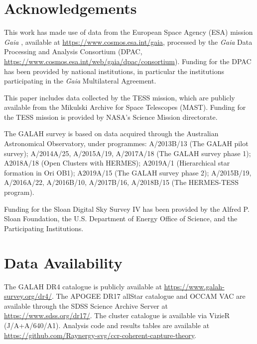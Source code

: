 \documentclass[fleqn,usenatbib]{mnras}
\begin{document}
\section*{Acknowledgements}

This work has made use of data from the European Space Agency (ESA) mission {\it Gaia} \citep{GaiaCollaboration2023}, available at \url{https://www.cosmos.esa.int/gaia}, processed by the {\it Gaia} Data Processing and Analysis Consortium (DPAC, \url{https://www.cosmos.esa.int/web/gaia/dpac/consortium}).
Funding for the DPAC has been provided by national institutions, in particular the institutions participating in the {\it Gaia} Multilateral Agreement.

This paper includes data collected by the TESS mission, which are publicly available from the Mikulski Archive for Space Telescopes (MAST).
Funding for the TESS mission is provided by NASA's Science Mission directorate.

The GALAH survey is based on data acquired through the Australian Astronomical Observatory, under programmes: A/2013B/13 (The GALAH pilot survey); A/2014A/25, A/2015A/19, A/2017A/18 (The GALAH survey phase 1); A2018A/18 (Open Clusters with HERMES); A2019A/1 (Hierarchical star formation in Ori OB1); A2019A/15 (The GALAH survey phase 2); A/2015B/19, A/2016A/22, A/2016B/10, A/2017B/16, A/2018B/15 (The HERMES-TESS program).

Funding for the Sloan Digital Sky Survey IV has been provided by the Alfred P. Sloan Foundation, the U.S. Department of Energy Office of Science, and the Participating Institutions.

\section*{Data Availability}

The GALAH DR4 catalogue is publicly available at \url{https://www.galah-survey.org/dr4/}.
The APOGEE DR17 allStar catalogue and OCCAM VAC are available through the SDSS Science Archive Server at \url{https://www.sdss.org/dr17/}.
The \citet{CantatGaudin2020} cluster catalogue is available via VizieR (J/A+A/640/A1).
Analysis code and results tables are available at \url{https://github.com/Raynergy-svg/ccr-coherent-capture-theory}.









\bsp	%
\label{lastpage}
\end{document}
